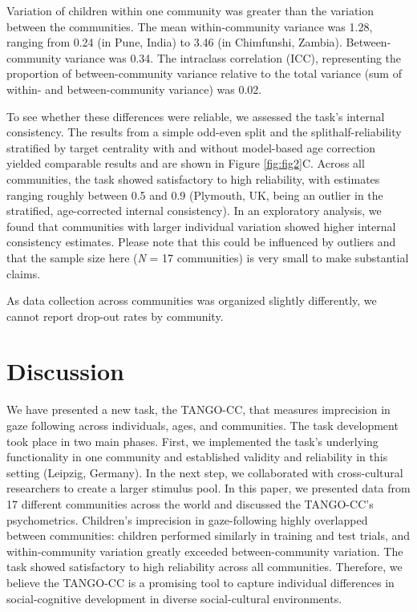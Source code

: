 \documentclass[
  man,mask,floatsintext]{apa7}
\begin{document}
Variation of children within one community was greater than the variation between the communities. The mean within-community variance was 1.28, ranging from 0.24 (in Pune, India) to 3.46 (in Chimfunshi, Zambia). Between-community variance was 0.34. The intraclass correlation (ICC), representing the proportion of between-community variance relative to the total variance (sum of within- and between-community variance) was 0.02.

To see whether these differences were reliable, we assessed the task's internal consistency. The results from a simple odd-even split and the splithalf-reliability stratified by target centrality with and without model-based age correction yielded comparable results and are shown in Figure \ref{fig:fig2}C. Across all communities, the task showed satisfactory to high reliability, with estimates ranging roughly between 0.5 and 0.9 (Plymouth, UK, being an outlier in the stratified, age-corrected internal consistency). In an exploratory analysis, we found that communities with larger individual variation showed higher internal consistency estimates. Please note that this could be influenced by outliers and that the sample size here (\emph{N} = 17 communities) is very small to make substantial claims.

As data collection across communities was organized slightly differently, we cannot report drop-out rates by community.

\hypertarget{discussion}{%
\section{Discussion}\label{discussion}}

We have presented a new task, the TANGO-CC, that measures imprecision in gaze following across individuals, ages, and communities. The task development took place in two main phases. First, we implemented the task's underlying functionality in one community and established validity and reliability in this setting (Leipzig, Germany). In the next step, we collaborated with cross-cultural researchers to create a larger stimulus pool. In this paper, we presented data from 17 different communities across the world and discussed the TANGO-CC's psychometrics. Children's imprecision in gaze-following highly overlapped between communities: children performed similarly in training and test trials, and within-community variation greatly exceeded between-community variation. The task showed satisfactory to high reliability across all communities. Therefore, we believe the TANGO-CC is a promising tool to capture individual differences in social-cognitive development in diverse social-cultural environments.
\end{document}

